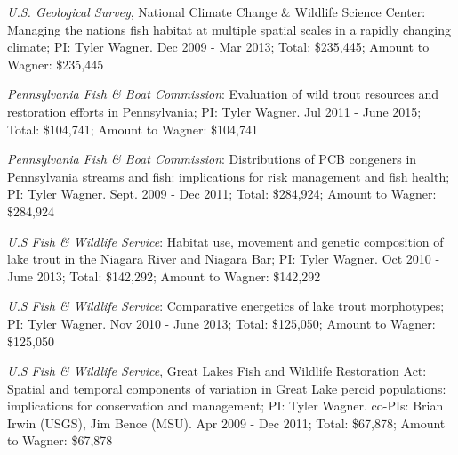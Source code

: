 \documentclass[10pt]{article}
\begin{document}
\begin{flushleft}
\begin{etaremune}
\item {\sl U.S. Geological Survey}, National Climate Change \& Wildlife Science Center: Managing the nations fish habitat at multiple spatial scales in a rapidly changing climate; PI: Tyler Wagner. Dec 2009 - Mar 2013; Total: \$235,445; Amount to Wagner: \$235,445

\item {\sl  Pennsylvania Fish \& Boat Commission}: Evaluation of wild trout resources and restoration efforts in Pennsylvania; PI: Tyler Wagner. Jul 2011 - June 2015; Total: \$104,741; Amount to Wagner: \$104,741

\item  {\sl  Pennsylvania Fish \& Boat Commission}: Distributions of PCB congeners in Pennsylvania streams and fish: implications for risk management and fish health; PI: Tyler Wagner. Sept. 2009 - Dec 2011; Total: \$284,924; Amount to Wagner: \$284,924

\item {\sl U.S Fish \& Wildlife Service}: Habitat use, movement and genetic composition of lake trout in the Niagara River and Niagara Bar; PI: Tyler Wagner. Oct 2010 - June 2013; Total: \$142,292;  Amount to Wagner: \$142,292

\item  {\sl U.S Fish \& Wildlife Service}: Comparative energetics of lake trout morphotypes; PI: Tyler Wagner. Nov 2010 - June 2013; Total: \$125,050; Amount to Wagner:  \$125,050

\item  {\sl U.S Fish \& Wildlife Service}, Great Lakes Fish and Wildlife Restoration Act: Spatial and temporal components of variation in Great Lake percid populations: implications for conservation and management; PI: Tyler Wagner. co-PIs: Brian Irwin (USGS), Jim Bence (MSU). Apr 2009 - Dec 2011; Total: \$67,878; Amount to Wagner: \$67,878
\end{etaremune}



\end{flushleft}
\end{document}
